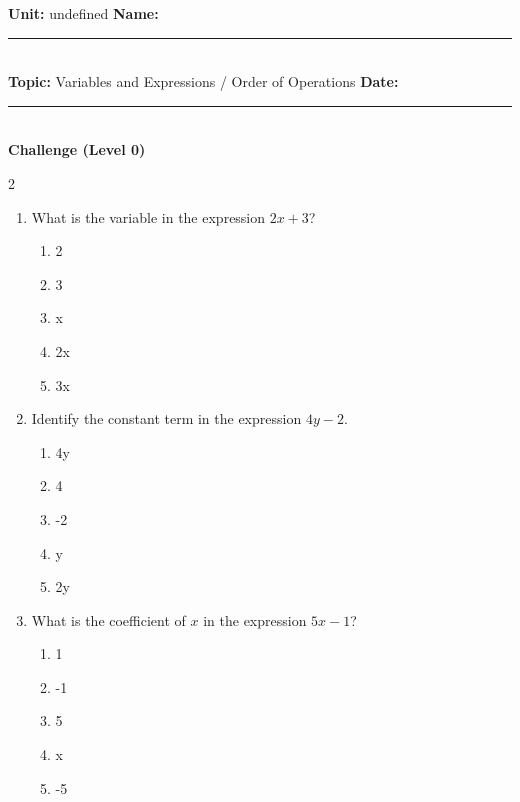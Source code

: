 \documentclass[10pt]{article}
\begin{document}
\enlargethispage{2.5cm}

\begin{tcolorbox}[colback=mainblue!5, colframe=mainblue, sharp corners, boxrule=0.5pt]
    \small \textbf{Unit:} undefined \hfill \textbf{Name:} \rule{3cm}{0.4pt} \\
    \small \textbf{Topic:} Variables and Expressions / Order of Operations \hfill \textbf{Date:} \rule{2cm}{0.4pt} \\
    \centering \textbf{\large Challenge (Level 0)}
\end{tcolorbox}

\vspace{0.2cm}

\begin{multicols}{2}
\begin{enumerate}[label=\textbf{Q\arabic*.}, leftmargin=*, itemsep=6pt, parsep=0pt]

  \item \small What is the variable in the expression $2x + 3$?
  \begin{enumerate}[label=(\Alph*), leftmargin=0.6cm, nosep, itemsep=2pt]
    \item 2
    \item 3
    \item x
    \item 2x
    \item 3x
  \end{enumerate}

  \item \small Identify the constant term in the expression $4y - 2$.
  \begin{enumerate}[label=(\Alph*), leftmargin=0.6cm, nosep, itemsep=2pt]
    \item 4y
    \item 4
    \item -2
    \item y
    \item 2y
  \end{enumerate}

  \item \small What is the coefficient of $x$ in the expression $5x - 1$?
  \begin{enumerate}[label=(\Alph*), leftmargin=0.6cm, nosep, itemsep=2pt]
    \item 1
    \item -1
    \item 5
    \item x
    \item -5
  \end{enumerate}


\end{enumerate}
\end{multicols}
\end{document}
